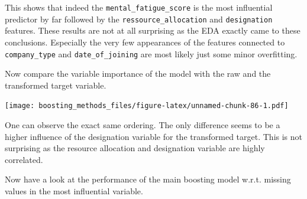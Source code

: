 \documentclass[
]{book}
\begin{document}
This shows that indeed the \texttt{mental\_fatigue\_score} is the most influential predictor by far followed by the \texttt{ressource\_allocation} and \texttt{designation} features. These results are not at all surprising as the EDA exactly came to these conclusions. Especially the very few appearances of the features connected to \texttt{company\_type} and \texttt{date\_of\_joining} are most likely just some minor overfitting.

Now compare the variable importance of the model with the raw and the transformed target variable.

\texttt{[image: boosting\_methods\_files/figure-latex/unnamed-chunk-86-1.pdf]}

One can observe the exact same ordering. The only difference seems to be a higher influence of the designation variable for the transformed target. This is not surprising as the resource allocation and designation variable are highly correlated.

Now have a look at the performance of the main boosting model w.r.t. missing values in the most influential variable.
\end{document}

